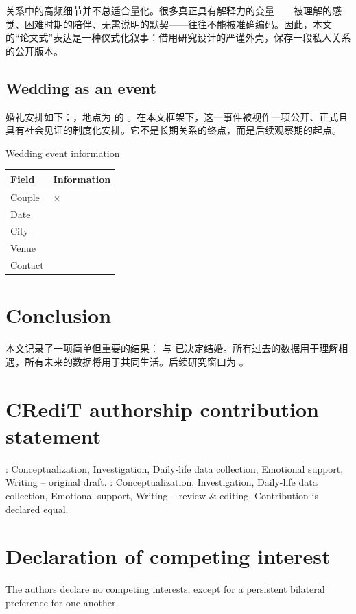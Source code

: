 \documentclass[9pt,twocolumn]{extarticle}
\begin{document}
关系中的高频细节并不总适合量化。很多真正具有解释力的变量——被理解的感觉、困难时期的陪伴、无需说明的默契——往往不能被准确编码。因此，本文的“论文式”表达是一种仪式化叙事：借用研究设计的严谨外壳，保存一段私人关系的公开版本。


\subsection{Wedding as an event}
婚礼安排如下：\WeddingDate{}，地点为 \WeddingCity{} 的 \WeddingVenue{}。在本文框架下，这一事件被视作一项公开、正式且具有社会见证的制度化安排。它不是长期关系的终点，而是后续观察期的起点。

\begin{JOLtable}{Wedding event information}
\begin{tabularx}{\columnwidth}{@{}lX@{}}\toprule
Field & Information\\\midrule
Couple & \PartnerA{} $\times$ \PartnerB{}\\
Date & \WeddingDate{}\\
City & \WeddingCity{}\\
Venue & \WeddingVenue{}\\
Contact & \ContactEmail{}\\\bottomrule
\end{tabularx}
\end{JOLtable}

\section{Conclusion}
本文记录了一项简单但重要的结果：\PartnerA{} 与 \PartnerB{} 已决定结婚。所有过去的数据用于理解相遇，所有未来的数据将用于共同生活。后续研究窗口为 \FutureHorizon{}。

\section*{CRediT authorship contribution statement}
\PartnerA{}: Conceptualization, Investigation, Daily-life data collection, Emotional support, Writing -- original draft. \PartnerB{}: Conceptualization, Investigation, Daily-life data collection, Emotional support, Writing -- review \& editing. Contribution is declared equal.

\section*{Declaration of competing interest}
The authors declare no competing interests, except for a persistent bilateral preference for one another.
\end{document}
